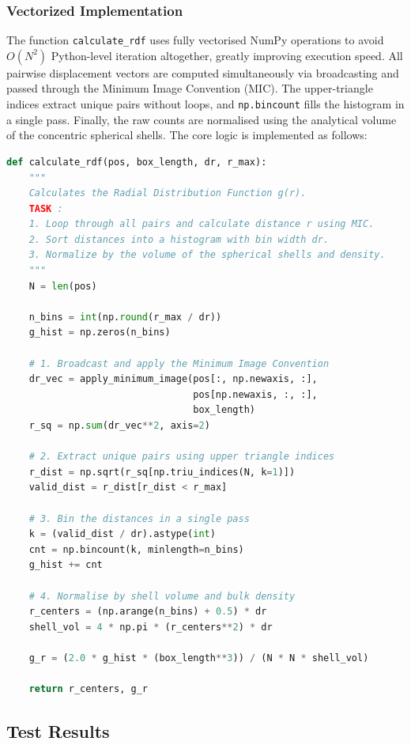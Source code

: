 \subsubsection{Vectorized Implementation}

The function \texttt{calculate\_rdf} uses fully vectorised NumPy operations to avoid $O(N^2)$ Python-level iteration altogether, greatly improving execution speed. All pairwise displacement vectors are computed simultaneously via broadcasting and passed through the Minimum Image Convention (MIC). The upper-triangle indices extract unique pairs without loops, and \texttt{np.bincount} fills the histogram in a single pass. Finally, the raw counts are normalised using the analytical volume of the concentric spherical shells. The core logic is implemented as follows:
\begin{lstlisting}[language=Python, caption={Radial distribution function calculation using vectorized histogramming}, label={lst:rdf_calc}]
def calculate_rdf(pos, box_length, dr, r_max):
    """
    Calculates the Radial Distribution Function g(r).
    TASK :
    1. Loop through all pairs and calculate distance r using MIC.
    2. Sort distances into a histogram with bin width dr.
    3. Normalize by the volume of the spherical shells and density.
    """
    N = len(pos)

    n_bins = int(np.round(r_max / dr))
    g_hist = np.zeros(n_bins)

    # 1. Broadcast and apply the Minimum Image Convention
    dr_vec = apply_minimum_image(pos[:, np.newaxis, :],
                                 pos[np.newaxis, :, :],
                                 box_length)
    r_sq = np.sum(dr_vec**2, axis=2)

    # 2. Extract unique pairs using upper triangle indices
    r_dist = np.sqrt(r_sq[np.triu_indices(N, k=1)])
    valid_dist = r_dist[r_dist < r_max]

    # 3. Bin the distances in a single pass
    k = (valid_dist / dr).astype(int)
    cnt = np.bincount(k, minlength=n_bins)
    g_hist += cnt

    # 4. Normalise by shell volume and bulk density
    r_centers = (np.arange(n_bins) + 0.5) * dr
    shell_vol = 4 * np.pi * (r_centers**2) * dr

    g_r = (2.0 * g_hist * (box_length**3)) / (N * N * shell_vol)

    return r_centers, g_r
\end{lstlisting}
\newpage
\subsection{Test Results}


